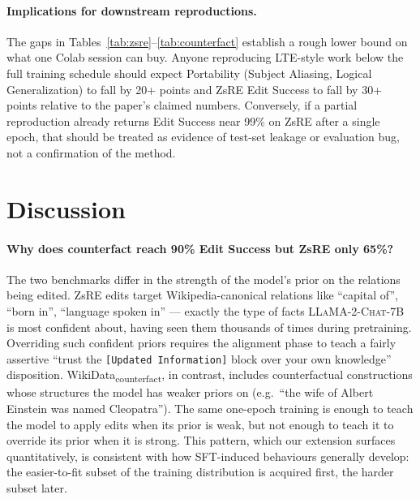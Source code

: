 \documentclass[11pt,a4paper,twocolumn]{article}
\begin{document}
\paragraph{Implications for downstream reproductions.} The gaps in Tables~\ref{tab:zsre}--\ref{tab:counterfact} establish a rough lower bound on what one Colab session can buy. Anyone reproducing LTE-style work below the full training schedule should expect Portability (Subject Aliasing, Logical Generalization) to fall by 20+ points and ZsRE Edit Success to fall by 30+ points relative to the paper's claimed numbers. Conversely, if a partial reproduction already returns Edit Success near 99\% on ZsRE after a single epoch, that should be treated as evidence of test-set leakage or evaluation bug, not a confirmation of the method.


\section{Discussion}
\label{sec:discussion}

\paragraph{Why does counterfact reach 90\% Edit Success but ZsRE only 65\%?} The two benchmarks differ in the strength of the model's prior on the relations being edited. ZsRE edits target Wikipedia-canonical relations like ``capital of'', ``born in'', ``language spoken in'' --- exactly the type of facts \textsc{LLaMA-2-Chat-7B} is most confident about, having seen them thousands of times during pretraining. Overriding such confident priors requires the alignment phase to teach a fairly assertive ``trust the \texttt{[Updated Information]} block over your own knowledge'' disposition. WikiData\textsubscript{counterfact}, in contrast, includes counterfactual constructions whose structures the model has weaker priors on (e.g.\ ``the wife of Albert Einstein was named Cleopatra''). The same one-epoch training is enough to teach the model to apply edits when its prior is weak, but not enough to teach it to override its prior when it is strong. This pattern, which our extension surfaces quantitatively, is consistent with how SFT-induced behaviours generally develop: the easier-to-fit subset of the training distribution is acquired first, the harder subset later.
\end{document}
